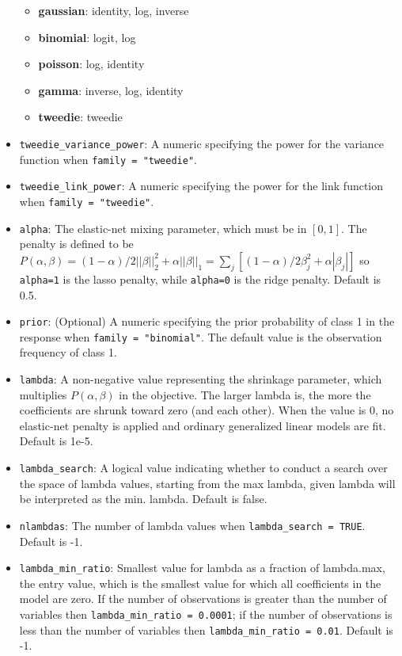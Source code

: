 \documentclass{article}[11pt]
\begin{document}
\begin{itemize}
	\begin{itemize}
\item	{\textbf {gaussian}}: identity, log, inverse 
\item {\textbf{binomial}}: logit, log 
\item {\textbf{poisson}}: log, identity
\item {\textbf{gamma}}: inverse, log, identity
\item {\textbf{tweedie}}: tweedie 
	\end{itemize}
\item \texttt{tweedie\_variance\_power}: A numeric specifying the power for the variance function when \texttt{family = "tweedie"}. 
\item \texttt{tweedie\_link\_power}: A numeric specifying the power for the link function when \texttt{family = "tweedie"}. 
\item \texttt{alpha}: The elastic-net mixing parameter, which must be in $[0,1]$. The penalty is defined to be $P(\alpha,\beta) = (1-\alpha)/2||\beta||_2^2 + \alpha||\beta||_1 = \sum_j [(1-\alpha)/2 \beta_j^2 + \alpha|\beta_j|] $ so \texttt{alpha=1} is the lasso penalty, while \texttt{alpha=0} is the ridge penalty. Default is 0.5.
\item \texttt{prior}: (Optional) A numeric specifying the prior probability of class 1 in the response when \texttt{family = "binomial"}. The default value is the observation frequency of class 1. 
\item \texttt{lambda}: A non-negative value representing the shrinkage parameter, which multiplies $P(\alpha,\beta)$ in the objective. The larger lambda is, the more the coefficients are shrunk toward zero (and each other). When the value is 0, no elastic-net penalty is applied and ordinary generalized linear models are fit. Default is 1e-5.
\item \texttt{lambda\_search}: A logical value indicating whether to conduct a search over the space of lambda values, starting from the max lambda, given lambda will be interpreted as the min. lambda. Default is false.
\item \texttt{nlambdas}: The number of lambda values when \texttt{lambda\_search = TRUE}. Default is -1.
\item \texttt{lambda\_min\_ratio}: Smallest value for lambda as a fraction of lambda.max, the entry value, which is the smallest value for which all coefficients in the model are zero. If the number of observations is greater than the number of variables then \texttt{lambda\_min\_ratio = 0.0001}; if the number of observations is less than the number of variables then \texttt{lambda\_min\_ratio = 0.01}. Default is -1.

\end{itemize}
\end{document}
